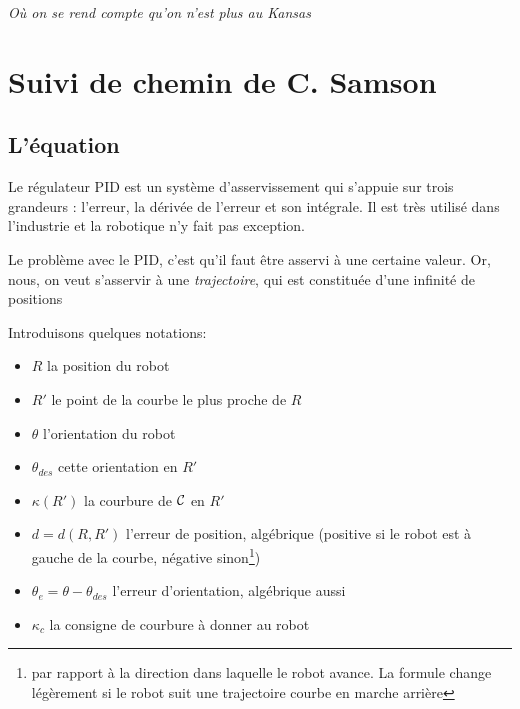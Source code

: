 \documentclass[11pt]{article}
\begin{document}
    \hfill \textit{Où on se rend compte qu'on n'est plus au Kansas}

    \section{Suivi de chemin de C. Samson}\label{sec:suiviDeCheminDeC.Samson}

    \subsection{L'équation}

    Le régulateur PID est un système d'asservissement qui s'appuie sur trois grandeurs : l'erreur, la dérivée de l'erreur et son intégrale. Il est très utilisé dans l'industrie et la robotique n'y fait pas exception.

    Le problème avec le PID, c'est qu'il faut être asservi à une certaine valeur. Or, nous, on veut s'asservir à une \emph{trajectoire}, qui est constituée d'une infinité de positions %


    Introduisons quelques notations:
    \begin{itemize}
        \item $R$ la position du robot
        \item $R'$ le point de la courbe le plus proche de $R$
        \item $\theta$ l'orientation du robot
        \item $\theta_{des}$ cette orientation en $R'$
        \item $\kappa(R')$ la courbure de $\cal C$ en $R'$
        \item $d = d(R, R')$ l'erreur de position, algébrique (positive si le robot est à gauche de la courbe, négative sinon\footnote{par rapport à la direction dans laquelle le robot avance. La formule change légèrement si le robot suit une trajectoire courbe en marche arrière})
        \item $\theta_e = \theta - \theta_{des}$ l'erreur d'orientation, algébrique aussi
        \item $\kappa_c$ la consigne de courbure à donner au robot
    \end{itemize}
\end{document}
